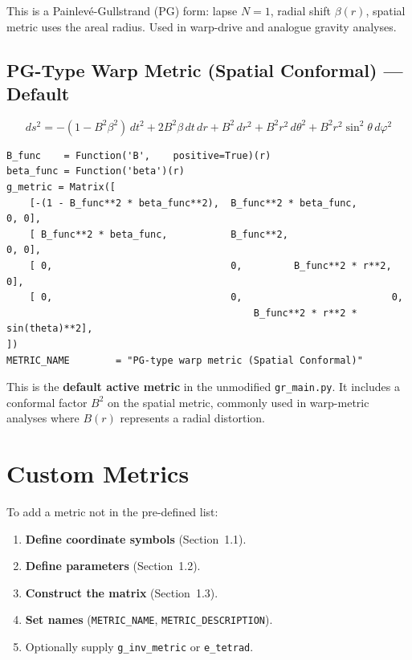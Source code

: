 \documentclass[11pt,a4paper]{article}
\newcommand{\code}[1]{\texttt{\small#1}}
\begin{document}
This is a Painlevé-Gullstrand (PG) form: lapse $N=1$, radial shift
$\beta(r)$, spatial metric uses the areal radius.  Used in warp-drive and
analogue gravity analyses.

\subsection{PG-Type Warp Metric (Spatial Conformal) — Default}
\label{sec:m-pg-conf}

\[
  ds^2 = -(1 - B^2\beta^2)\,dt^2
         + 2B^2\beta\,dt\,dr
         + B^2\,dr^2 + B^2 r^2\,d\theta^2 + B^2 r^2\sin^2\!\theta\,d\varphi^2
\]

\begin{lstlisting}
B_func    = Function('B',    positive=True)(r)
beta_func = Function('beta')(r)
g_metric = Matrix([
    [-(1 - B_func**2 * beta_func**2),  B_func**2 * beta_func,             0, 0],
    [ B_func**2 * beta_func,           B_func**2,                         0, 0],
    [ 0,                               0,         B_func**2 * r**2,       0],
    [ 0,                               0,                          0,
                                           B_func**2 * r**2 * sin(theta)**2],
])
METRIC_NAME        = "PG-type warp metric (Spatial Conformal)"
\end{lstlisting}

This is the \textbf{default active metric} in the unmodified
\code{gr\_main.py}.  It includes a conformal factor $B^2$ on the spatial
metric, commonly used in warp-metric analyses where $B(r)$ represents a
radial distortion.

\section{Custom Metrics}
\label{sec:custom}

To add a metric not in the pre-defined list:

\begin{enumerate}
  \item \textbf{Define coordinate symbols} (Section~1.1).
  \item \textbf{Define parameters} (Section~1.2).
  \item \textbf{Construct the matrix} (Section~1.3).
  \item \textbf{Set names} (\code{METRIC\_NAME}, \code{METRIC\_DESCRIPTION}).
  \item Optionally supply \code{g\_inv\_metric} or \code{e\_tetrad}.
\end{enumerate}
\end{document}
